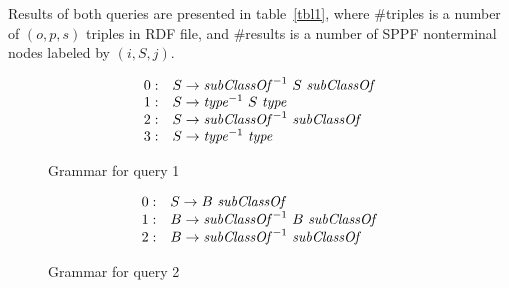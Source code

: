 Results of both queries are presented in table~\ref{tbl1}, where \#triples is a number of $(o,p,s)$ triples in RDF file, and \#results is a number of SPPF nonterminal nodes labeled by $(i,S,j)$.

\begin{figure}[ht]
   \begin{center}
   \[
\begin{array}{rl}
   0: & S \rightarrow \text{\textit{subClassOf}}^{-1} \ S \ \text{\textit{subClassOf}} \\ 
   1: & S \rightarrow \text{\textit{type}}^{-1} \ S \ \text{\textit{type}} \\ 
   2: & S \rightarrow \text{\textit{subClassOf}}^{-1} \ \text{\textit{subClassOf}} \\ 
   3: & S \rightarrow \text{\textit{type}}^{-1} \ \text{\textit{type}} \\ 
\end{array}
\]
   \caption{Grammar for query 1}
   \label{grammarQ1}        
   \end{center}
\end{figure}

\begin{figure}[ht]
   \begin{center}
   \[
\begin{array}{rl}
   0: & S \rightarrow B \ \text{\textit{subClassOf}} \\ 
   1: & B \rightarrow \text{\textit{subClassOf}}^{-1} \ B \ \text{\textit{subClassOf}} \\
   2: & B \rightarrow \text{\textit{subClassOf}}^{-1} \ \text{\textit{subClassOf}} \\ 
\end{array}
\]
   \caption{Grammar for query 2}
   \label{grammarQ2}        
   \end{center}
\end{figure}


